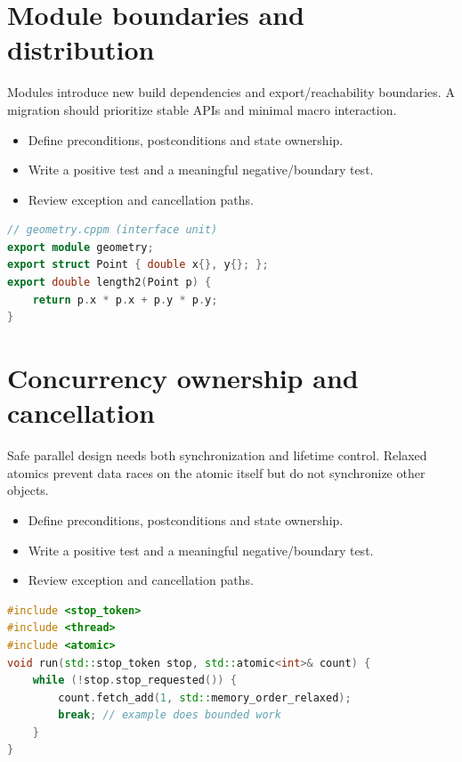 \documentclass[11pt]{article}
\begin{document}
\section{Module boundaries and distribution}
Modules introduce new build dependencies and export/reachability boundaries. A migration should prioritize stable APIs and minimal macro interaction.

\begin{itemize}[leftmargin=*,itemsep=1pt,topsep=3pt]
\item Define preconditions, postconditions and state ownership.
\item Write a positive test and a meaningful negative/boundary test.
\item Review exception and cancellation paths.
\end{itemize}
\begin{lstlisting}[language=C++]
// geometry.cppm (interface unit)
export module geometry;
export struct Point { double x{}, y{}; };
export double length2(Point p) {
    return p.x * p.x + p.y * p.y;
}
\end{lstlisting}
\section{Concurrency ownership and cancellation}
Safe parallel design needs both synchronization and lifetime control. Relaxed atomics prevent data races on the atomic itself but do not synchronize other objects.

\begin{itemize}[leftmargin=*,itemsep=1pt,topsep=3pt]
\item Define preconditions, postconditions and state ownership.
\item Write a positive test and a meaningful negative/boundary test.
\item Review exception and cancellation paths.
\end{itemize}
\begin{lstlisting}[language=C++]
#include <stop_token>
#include <thread>
#include <atomic>
void run(std::stop_token stop, std::atomic<int>& count) {
    while (!stop.stop_requested()) {
        count.fetch_add(1, std::memory_order_relaxed);
        break; // example does bounded work
    }
}
\end{lstlisting}
\end{document}
